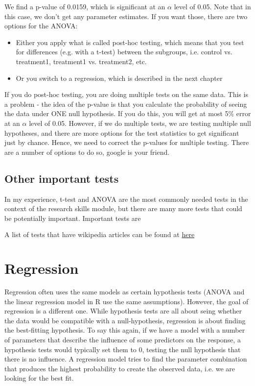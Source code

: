 \documentclass[a4paper,twoside]{tufte-book} %
\begin{document}
We find a p-value of 0.0159, which is significant at an $\alpha$ level of 0.05. Note that in this case, we don't get any parameter estimates. If you want those, there are two options for the ANOVA:
\begin{itemize}
\item Either you apply what is called post-hoc testing, which means that you test for differences (e.g. with a t-test) between the subgroups, i.e. control vs. treatment1, treatment1 vs. treatment2, etc.
\item Or you switch to a regression, which is described in the next chapter
\end{itemize}
If you do post-hoc testing, you are doing multiple tests on the same data. This is a problem - the idea of the p-value is that you calculate the probability of seeing the data under ONE null hypothesis. If you do this, you will get at most 5\% error at an $\alpha$ level of 0.05.  However, if we do multiple tests, we are testing multiple null hypotheses, and there are more options for the test statistics to get significant just by chance. Hence, we need to correct the p-values for multiple testing. There are a number of options to do so, google is your friend. 

\section{Other important tests}

In my experience, t-test and ANOVA are the most commonly needed tests in the context of the research skills module, but there are many more tests that could be potentially important. Important tests are 


A list of tests that have wikipedia articles can be found at \href{http://en.wikipedia.org/wiki/Category:Statistical_tests}{here} 



\chapter{Regression}

Regression often uses the same models as certain hypothesis tests (ANOVA and the linear regression model in R use the same assumptions). However, the goal of regression is a different one. While hypothesis tests are all about seing whether the data would be compatible with a null-hypothesis, regression is about finding the best-fitting hypothesis. To say this again, if we have a model with a number of parameters that describe the influence of some predictors on the response, a hypothesis tests would typically set them to 0, testing the null hypothesis that there is no influence. A regression model tries to find the parameter combination that produces the highest probability to create the observed data, i.e. we are looking for the best fit.
\end{document}

